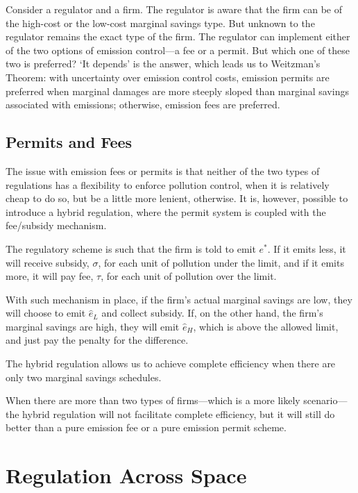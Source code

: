 \documentclass[
]{book}
\begin{document}
Consider a regulator and a firm. The regulator is aware that the firm can be of the high-cost or the low-cost marginal savings type. But unknown to the regulator remains the exact type of the firm. The regulator can implement either of the two options of emission control---a fee or a permit. But which one of these two is preferred? `It depends' is the answer, which leads us to Weitzman's Theorem: with uncertainty over emission control costs, emission permits are preferred when marginal damages are more steeply sloped than marginal savings associated with emissions; otherwise, emission fees are preferred.

\hypertarget{permits-and-fees}{%
\section{Permits and Fees}\label{permits-and-fees}}

The issue with emission fees or permits is that neither of the two types of regulations has a flexibility to enforce pollution control, when it is relatively cheap to do so, but be a little more lenient, otherwise. It is, however, possible to introduce a hybrid regulation, where the permit system is coupled with the fee/subsidy mechanism.

The regulatory scheme is such that the firm is told to emit \(e^*\). If it emits less, it will receive subsidy, \(\sigma\), for each unit of pollution under the limit, and if it emits more, it will pay fee, \(\tau\), for each unit of pollution over the limit.

With such mechanism in place, if the firm's actual marginal savings are low, they will choose to emit \(\hat{e}_L\) and collect subsidy. If, on the other hand, the firm's marginal savings are high, they will emit \(\hat{e}_H\), which is above the allowed limit, and just pay the penalty for the difference.

The hybrid regulation allows us to achieve complete efficiency when there are only two marginal savings schedules.

When there are more than two types of firms---which is a more likely scenario---the hybrid regulation will not facilitate complete efficiency, but it will still do better than a pure emission fee or a pure emission permit scheme.

\hypertarget{regulation-across-space}{%
\chapter{Regulation Across Space}\label{regulation-across-space}}
\end{document}
